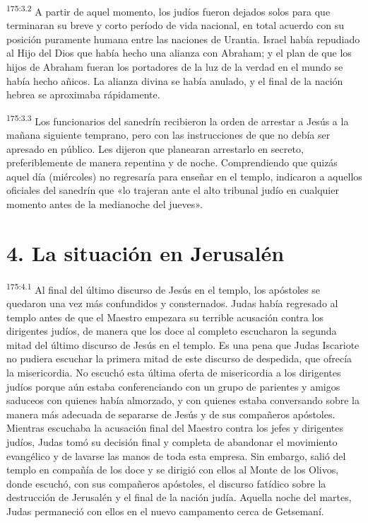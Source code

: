 \par
\textsuperscript{175:3.2} A partir de aquel momento, los judíos fueron dejados solos para que terminaran su breve y corto período de vida nacional, en total acuerdo con su posición puramente humana entre las naciones de Urantia. Israel había repudiado al Hijo del Dios que había hecho una alianza con Abraham; y el plan de que los hijos de Abraham fueran los portadores de la luz de la verdad en el mundo se había hecho añicos. La alianza divina se había anulado, y el final de la nación hebrea se aproximaba rápidamente.

\par
\textsuperscript{175:3.3} Los funcionarios del sanedrín recibieron la orden de arrestar a Jesús a la mañana siguiente temprano, pero con las instrucciones de que no debía ser apresado en público. Les dijeron que planearan arrestarlo en secreto, preferiblemente de manera repentina y de noche. Comprendiendo que quizás aquel día (miércoles) no regresaría para enseñar en el templo, indicaron a aquellos oficiales del sanedrín que «lo trajeran ante el alto tribunal judío en cualquier momento antes de la medianoche del jueves».

\section*{4. La situación en Jerusalén}
\par
\textsuperscript{175:4.1} Al final del último discurso de Jesús en el templo, los apóstoles se quedaron una vez más confundidos y consternados. Judas había regresado al templo antes de que el Maestro empezara su terrible acusación contra los dirigentes judíos, de manera que los doce al completo escucharon la segunda mitad del último discurso de Jesús en el templo. Es una pena que Judas Iscariote no pudiera escuchar la primera mitad de este discurso de despedida, que ofrecía la misericordia. No escuchó esta última oferta de misericordia a los dirigentes judíos porque aún estaba conferenciando con un grupo de parientes y amigos saduceos con quienes había almorzado, y con quienes estaba conversando sobre la manera más adecuada de separarse de Jesús y de sus compañeros apóstoles. Mientras escuchaba la acusación final del Maestro contra los jefes y dirigentes judíos, Judas tomó su decisión final y completa de abandonar el movimiento evangélico y de lavarse las manos de toda esta empresa. Sin embargo, salió del templo en compañía de los doce y se dirigió con ellos al Monte de los Olivos, donde escuchó, con sus compañeros apóstoles, el discurso fatídico sobre la destrucción de Jerusalén y el final de la nación judía. Aquella noche del martes, Judas permaneció con ellos en el nuevo campamento cerca de Getsemaní.

